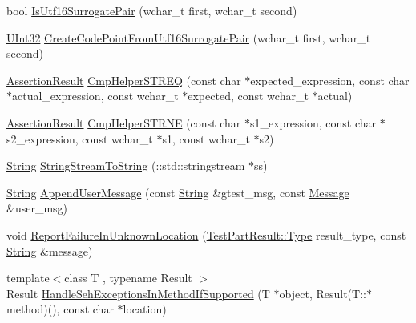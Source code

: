 \begin{DoxyCompactItemize}
\item 
bool \hyperlink{namespacetesting_1_1internal_a5295827a346d31a82436982e915b70fb}{\-Is\-Utf16\-Surrogate\-Pair} (wchar\-\_\-t first, wchar\-\_\-t second)
\item 
\hyperlink{namespacetesting_1_1internal_a03df445d5850459574de6ffb6f57ae95}{\-U\-Int32} \hyperlink{namespacetesting_1_1internal_a5148378e34622f080776dafb62a40a44}{\-Create\-Code\-Point\-From\-Utf16\-Surrogate\-Pair} (wchar\-\_\-t first, wchar\-\_\-t second)
\item 
\hyperlink{classtesting_1_1AssertionResult}{\-Assertion\-Result} \hyperlink{namespacetesting_1_1internal_a56283a915608e035442712d3b92a105b}{\-Cmp\-Helper\-S\-T\-R\-E\-Q} (const char $\ast$expected\-\_\-expression, const char $\ast$actual\-\_\-expression, const wchar\-\_\-t $\ast$expected, const wchar\-\_\-t $\ast$actual)
\item 
\hyperlink{classtesting_1_1AssertionResult}{\-Assertion\-Result} \hyperlink{namespacetesting_1_1internal_a7d89106441de99b36b0971c57caadc2d}{\-Cmp\-Helper\-S\-T\-R\-N\-E} (const char $\ast$s1\-\_\-expression, const char $\ast$s2\-\_\-expression, const wchar\-\_\-t $\ast$s1, const wchar\-\_\-t $\ast$s2)
\item 
\hyperlink{classtesting_1_1internal_1_1String}{\-String} \hyperlink{namespacetesting_1_1internal_abf99dee8db2ca5a9bc512dd6cc34f048}{\-String\-Stream\-To\-String} (\-::std\-::stringstream $\ast$ss)
\item 
\hyperlink{classtesting_1_1internal_1_1String}{\-String} \hyperlink{namespacetesting_1_1internal_a92cc3c0f16012ce7143a5c3256c00a29}{\-Append\-User\-Message} (const \hyperlink{classtesting_1_1internal_1_1String}{\-String} \&gtest\-\_\-msg, const \hyperlink{classtesting_1_1Message}{\-Message} \&user\-\_\-msg)
\item 
void \hyperlink{namespacetesting_1_1internal_a544a5c0a7bc19f664d434be72ecbdbfa}{\-Report\-Failure\-In\-Unknown\-Location} (\hyperlink{classtesting_1_1TestPartResult_a1d1cfd8ffb84e947f82999c682b666a7}{\-Test\-Part\-Result\-::\-Type} result\-\_\-type, const \hyperlink{classtesting_1_1internal_1_1String}{\-String} \&message)
\item 
{\footnotesize template$<$class T , typename Result $>$ }\\\-Result \hyperlink{namespacetesting_1_1internal_ac7b1ac01c4703111210df6badab74591}{\-Handle\-Seh\-Exceptions\-In\-Method\-If\-Supported} (\-T $\ast$object, \-Result(\-T\-::$\ast$method)(), const char $\ast$location)
\item 

\end{DoxyCompactItemize}
